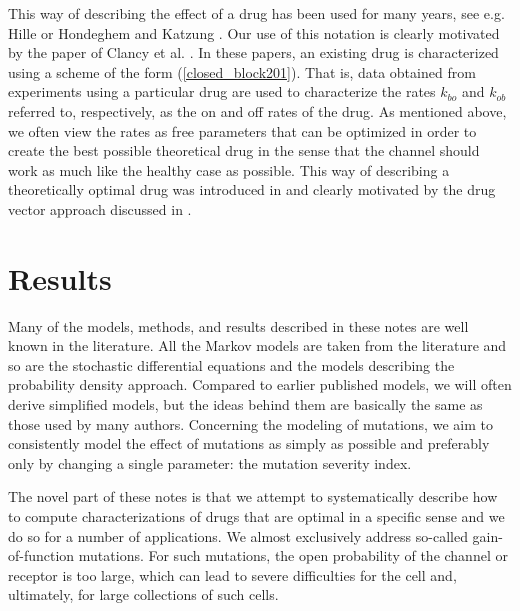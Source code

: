 This way of describing the effect of a drug has been used for many years, see e.g. Hille \cite{Hille1977} or Hondeghem and Katzung \cite{Hondeghem1977}. Our use of this notation is clearly motivated by the paper of Clancy et al. \cite{Clancy2007}. In these papers, an existing drug is characterized using a scheme of the form (\ref{closed_block201}). That is, data obtained from experiments using a particular drug are used to characterize the rates $k_{bo}$ and $k_{ob}$ referred to, respectively, as the on and off rates of the drug. As mentioned above, we often view the rates as free parameters that can be optimized in order to create the best possible theoretical drug in the sense that the channel should work as much like the healthy case as possible. This way of describing a theoretically optimal drug was introduced in \cite{Tveito2011c} and clearly motivated by the drug vector approach discussed in   \cite{Tveito2009}.


\section{Results}
Many of the models, methods, and results described in these notes are well known in the literature. All the Markov models are taken from the literature and so are the stochastic differential equations and the models describing the probability density approach. Compared to earlier published models, we will often derive simplified models, but the ideas behind them are basically the same as those used by many authors. Concerning the modeling of mutations, we aim to consistently model the effect of mutations as simply as possible and preferably only by changing a single parameter: the mutation severity index. 

The novel part of these notes is that we attempt to systematically describe how to compute characterizations of drugs that are optimal in a specific sense and we do so for a number of applications. We almost exclusively address so-called gain-of-function mutations. For such mutations, the open probability of the channel or receptor is too large, which can lead to severe difficulties for the cell and, ultimately, for large collections of such cells. 

